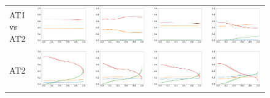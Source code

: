 \begin{figure}
{\begin{tabular}{lcccc}
AT1 vs AT2 & \includegraphics[width=.25\linewidth]{code/img/operation_count_ld_AT1-2.pdf} & \includegraphics[width=.25\linewidth]{code/img/operation_count_zss_AT1-2.pdf} & \includegraphics[width=.25\linewidth]{code/img/operation_count_rrd_AT1-2.pdf} & \includegraphics[width=.25\linewidth]{code/img/operation_count_ms_AT1-2.pdf} \\
AT2 & \includegraphics[width=.25\linewidth]{code/img/operation_count_ld_AT2.pdf} & \includegraphics[width=.25\linewidth]{code/img/operation_count_zss_AT2.pdf} & \includegraphics[width=.25\linewidth]{code/img/operation_count_rrd_AT2.pdf} & \includegraphics[width=.25\linewidth]{code/img/operation_count_ms_AT2.pdf}

\end{tabular}}
\end{figure}
